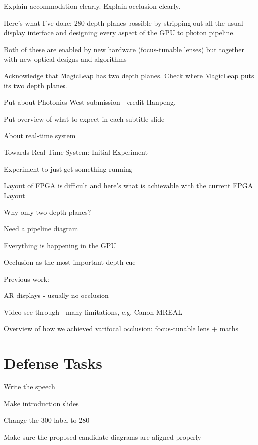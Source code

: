 \begin{compact_itemize}
\item Explain accommodation clearly. Explain occlusion clearly.
\item Here's what I've done: 280 depth planes possible by stripping out all the usual display interface and designing every aspect of the GPU to photon pipeline.
\item Both of these are enabled by new hardware (focus-tunable lenses) but together with new optical designs and algorithms
\item Acknowledge that MagicLeap has two depth planes. Check where MagicLeap puts its two depth planes. 
\item Put about Photonics West submission - credit Hanpeng.
\item Put overview of what to expect in each subtitle slide
\item About real-time system
    \begin{compact_itemize}
    \item Towards Real-Time System: Initial Experiment
    \item Experiment to just get something running
    \item Layout of FPGA is difficult and here's what is achievable with the current FPGA Layout
    \item Why only two depth planes?
    \item Need a pipeline diagram
    \item Everything is happening in the GPU
    \end{compact_itemize}
\item Occlusion as the most important depth cue
\item Previous work:
    \begin{compact_itemize}
    \item AR displays - usually no occlusion
    \item Video see through - many limitations, e.g. Canon MREAL
    \end{compact_itemize}
\item Overview of how we achieved varifocal occlusion: focus-tunable lens + maths
\end{compact_itemize}

\section{Defense Tasks}
\begin{compact_todolist}
\item Write the speech
\item Make introduction slides
\item Change the 300 label to 280
\item Make sure the proposed candidate diagrams are aligned properly
\end{compact_todolist}

